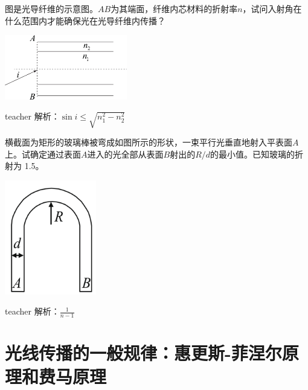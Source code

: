 \begin{example}
图是光导纤维的示意图。$AB$为其端面，纤维内芯材料的折射率$n$，试问入射角在什么范围内才能确保光在光导纤维内传播？
	\begin{flushright}
		\includegraphics[width = 0.4\textwidth]{images/opt-5.pdf} 
	\end{flushright}
\begin{taggedblock}{teacher}
\noindent
解析：$\sin i\leq\sqrt{n_1^2-n_2^2}$
\end{taggedblock}
\end{example}


\begin{example}
横截面为矩形的玻璃棒被弯成如图所示的形状，一束平行光垂直地射入平表面$A$上。试确定通过表面$A$进入的光全部从表面$B$射出的$ R/d$的最小值。已知玻璃的折射为 1.5。
	\begin{flushright}
		\includegraphics[width = 0.3\textwidth]{images/opt-7.pdf} 
	\end{flushright}
	\begin{taggedblock}{teacher}
		\noindent
		解析：$\frac{1}{n-1}$
	\end{taggedblock}
\end{example}





\section{光线传播的一般规律：惠更斯-菲涅尔原理和费马原理}

